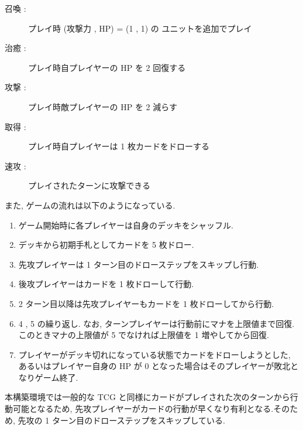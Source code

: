 \documentclass[twocolumn]{jarticle}
\begin{document}
\begin{description}
   \vspace{-0.15cm}
   \setlength{\itemsep}{0cm}
   \small
  \item[召喚 :]  プレイ時 (攻撃力 , HP) = (1 , 1) の
  ユニットを追加でプレイ
  \item[治癒 :]  プレイ時自プレイヤーの HP を 2 回復する
  \item[攻撃 :]  プレイ時敵プレイヤーの HP を 2 減らす
  \item[取得 :]  プレイ時自プレイヤーは 1 枚カードをドローする
  \item[速攻 :]  プレイされたターンに攻撃できる
\end{description}
\vspace{-0.3cm}
また, ゲームの流れは以下のようになっている.
\begin{enumerate}
  \small
  \vspace{-0.15cm}
  \setlength{\itemsep}{0cm} %
  \item ゲーム開始時に各プレイヤーは自身のデッキをシャッフル.
  \item デッキから初期手札としてカードを 5 枚ドロー. 
  \item 先攻プレイヤーは 1 ターン目のドローステップをスキップし行動.
  \item 後攻プレイヤーはカードを 1 枚ドローして行動.
  \item 2 ターン目以降は先攻プレイヤーもカードを 1 枚ドローしてから行動. 
  \item 4 , 5 の繰り返し. なお, ターンプレイヤーは行動前にマナを上限値まで回復. このときマナの上限値が 5 でなければ上限値を 1 増やしてから回復.
  \item プレイヤーがデッキ切れになっている状態でカードをドローしようとした, あるいはプレイヤー自身の HP が 0 となった場合はそのプレイヤーが敗北となりゲーム終了.
\end{enumerate}
\vspace{-0.15cm}
\par
本構築環境では一般的な TCG と同様にカードがプレイされた次のターンから行動可能となるため, 先攻プレイヤーがカードの行動が早くなり有利となる.そのため, 先攻の 1 ターン目のドローステップをスキップしている. 
\end{document}
